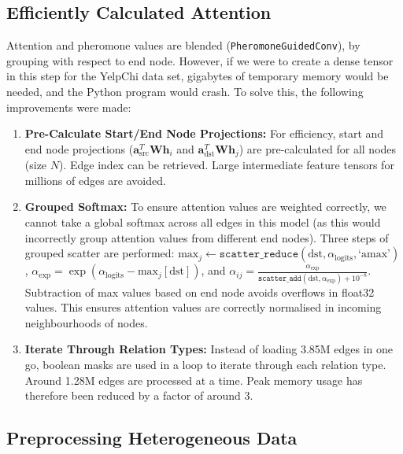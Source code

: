 \subsection{Efficiently Calculated Attention}
\label{subsec:chunked_attention}

Attention and pheromone values are blended (\texttt{PheromoneGuidedConv}), by grouping with respect to end node. However, if we were to create a dense tensor in this step for the YelpChi data set, gigabytes of temporary memory would be needed, and the Python program would crash. To solve this, the following improvements were made:

\begin{enumerate}
    \item \textbf{Pre-Calculate Start/End Node Projections:} For efficiency, start and end node projections ($\mathbf{a}_{\text{src}}^T \mathbf{W} \mathbf{h}_i$ and $\mathbf{a}_{\text{dst}}^T \mathbf{W} \mathbf{h}_j$) are pre-calculated for all nodes (size $N$). Edge index can be retrieved. Large intermediate feature tensors for millions of edges are avoided.
    \item \textbf{Grouped Softmax:} To ensure attention values are weighted correctly, we cannot take a global softmax across all edges in this model (as this would incorrectly group attention values from different end nodes). Three steps of grouped scatter are performed: $\text{max}_{j} \leftarrow \texttt{scatter\_reduce}(\text{dst}, \alpha_{\text{logits}}, \text{`amax'})$, $\alpha_{\text{exp}} = \exp(\alpha_{\text{logits}} - \text{max}_{j}[\text{dst}])$, and $\alpha_{ij} = \frac{\alpha_{\text{exp}}}{\texttt{scatter\_add}(\text{dst}, \alpha_{\text{exp}}) + 10^{-8}}$. Subtraction of max values based on end node avoids overflows in float32 values. This ensures attention values are correctly normalised in incoming neighbourhoods of nodes.
    \item \textbf{Iterate Through Relation Types:} Instead of loading 3.85M edges in one go, boolean masks are used in a loop to iterate through each relation type. Around 1.28M edges are processed at a time. Peak memory usage has therefore been reduced by a factor of around 3.
\end{enumerate}

\subsection{Preprocessing Heterogeneous Data}
\label{subsec:feature_preprocessing}

